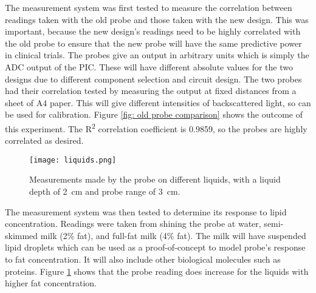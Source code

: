 The measurement system was first tested to measure the correlation between readings taken with the old probe and those taken with the new design. This was important, because the new design's readings need to be highly correlated with the old probe to ensure that the new probe will have the same predictive power in clinical trials. The probes give an output in arbitrary units which is simply the ADC output of the PIC. These will have different absolute values for the two designs due to different component selection and circuit design. The two probes had their correlation tested by measuring the output at fixed distances from a sheet of A4 paper. This will give different intensities of backscattered light, so can be used for calibration. Figure \ref{fig: old probe comparison} shows the outcome of this experiment. The R\textsuperscript{2} correlation coefficient is 0.9859, so the probes are highly correlated as desired. \\

\begin{figure}[htbp]
	\centering
	\texttt{[image: liquids.png]}
	\caption{Measurements made by the probe on different liquids, with a liquid depth of \SI{2}{\centi\metre} and probe range of \SI{3}{\centi\metre}.}
	\label{fig: liquids}
\end{figure}

The measurement system was then tested to determine its response to lipid concentration. Readings were taken from shining the probe at water, semi-skimmed milk (2\% fat), and full-fat milk (4\% fat). The milk will have suspended lipid droplets which can be used as a proof-of-concept to model probe's response to fat concentration. It will also include other biological molecules such as proteins. Figure \ref{fig: liquids} shows that the probe reading does increase for the liquids with higher fat concentration.






